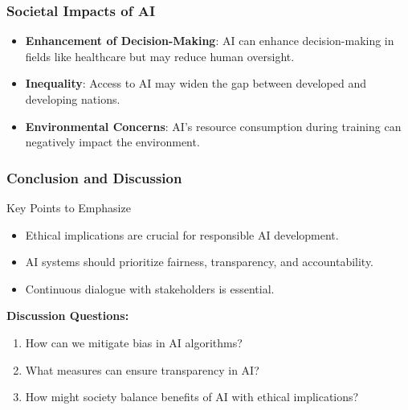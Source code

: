\documentclass{beamer}
\begin{document}
\begin{frame}[fragile]
    \frametitle{Societal Impacts of AI}
    \begin{itemize}
        \item \textbf{Enhancement of Decision-Making}:
            AI can enhance decision-making in fields like healthcare but may reduce human oversight.
        
        \item \textbf{Inequality}:
            Access to AI may widen the gap between developed and developing nations.
        
        \item \textbf{Environmental Concerns}:
            AI's resource consumption during training can negatively impact the environment.
    \end{itemize}
\end{frame}

\begin{frame}[fragile]
    \frametitle{Conclusion and Discussion}
    \begin{block}{Key Points to Emphasize}
        \begin{itemize}
            \item Ethical implications are crucial for responsible AI development.
            \item AI systems should prioritize fairness, transparency, and accountability.
            \item Continuous dialogue with stakeholders is essential.
        \end{itemize}
    \end{block}
    \textbf{Discussion Questions:}
    \begin{enumerate}
        \item How can we mitigate bias in AI algorithms?
        \item What measures can ensure transparency in AI?
        \item How might society balance benefits of AI with ethical implications?
    \end{enumerate}
\end{frame}
\end{document}
